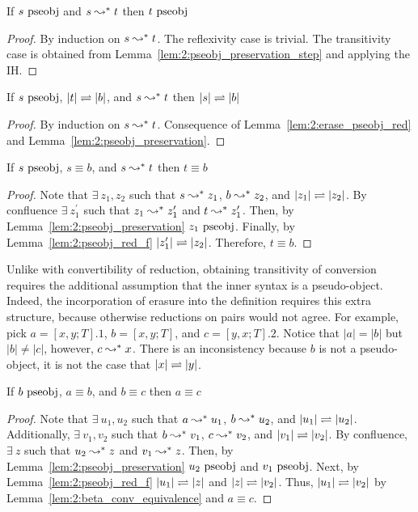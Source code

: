 \begin{lemma}
    \label{lem:2:pseobj_preservation}
    If $s~\textnormal{pseobj}$ and $s \leadsto^* t$ then $t~\textnormal{pseobj}$
\end{lemma}
\begin{proof}
    By induction on $s \leadsto^* t$.
    The reflexivity case is trivial.
    The transitivity case is obtained from Lemma~\ref{lem:2:pseobj_preservation_step} and applying the IH.
\end{proof}

\begin{lemma}
    \label{lem:2:pseobj_red_b}
    If $s~\textnormal{pseobj}$, $|t| \rightleftharpoons |b|$, and $s \leadsto^* t$ then $|s| \rightleftharpoons |b|$
\end{lemma}
\begin{proof}
    By induction on $s \leadsto^* t$.
    Consequence of Lemma~\ref{lem:2:erase_pseobj_red} and Lemma~\ref{lem:2:pseobj_preservation}.
\end{proof}

\begin{lemma}
    \label{lem:2:conv_red_f}
    If $s~\textnormal{pseobj}$, $s \equiv b$, and $s \leadsto^* t$ then $t \equiv b$
\end{lemma}
\begin{proof}
    Note that $\exists\ z_1, z_2$ such that $s \leadsto^* z_1$, $b \leadsto^* z_2$, and $|z_1| \rightleftharpoons |z_2|$.
    By confluence $\exists\ z_1^\prime$ such that $z_1 \leadsto^* z_1^\prime$ and $t \leadsto^* z_1^\prime$.
    Then, by Lemma~\ref{lem:2:pseobj_preservation} $z_1~\textnormal{pseobj}$.
    Finally, by Lemma~\ref{lem:2:pseobj_red_f} $|z_1^\prime| \rightleftharpoons |z_2|$.
    Therefore, $t \equiv b$.
\end{proof}

Unlike with convertibility of reduction, obtaining transitivity of conversion requires the additional assumption that the inner syntax is a pseudo-object.
Indeed, the incorporation of erasure into the definition requires this extra structure, because otherwise reductions on pairs would not agree.
For example, pick $a = [x, y; T].1$, $b = [x, y; T]$, and $c = [y, x; T].2$.
Notice that $|a| = |b|$ but $|b| \neq |c|$, however, $c \leadsto^* x$.
There is an inconsistency because $b$ is not a pseudo-object, it is not the case that $|x| \rightleftharpoons |y|$.

\begin{lemma}
    If $b~\textnormal{pseobj}$, $a \equiv b$, and $b \equiv c$ then $a \equiv c$
    \label{thm:2:conv_trans}
\end{lemma}
\begin{proof}
    Note that $\exists\ u_1, u_2$ such that $a \leadsto^* u_1$, $b \leadsto^* u_2$, and $|u_1| \rightleftharpoons |u_2|$.
    Additionally, $\exists\ v_1, v_2$ such that $b \leadsto^* v_1$, $c \leadsto^* v_2$, and $|v_1| \rightleftharpoons |v_2|$.
    By confluence, $\exists\ z$ such that $u_2 \leadsto^* z$ and $v_1 \leadsto^* z$.
    Then, by Lemma~\ref{lem:2:pseobj_preservation} $u_2~\textnormal{pseobj}$ and $v_1~\textnormal{pseobj}$.
    Next, by Lemma~\ref{lem:2:pseobj_red_f} $|u_1| \rightleftharpoons |z|$ and $|z| \rightleftharpoons |v_2|$.
    Thus, $|u_1| \rightleftharpoons |v_2|$ by Lemma~\ref{lem:2:beta_conv_equivalence} and $a \equiv c$.
\end{proof}

